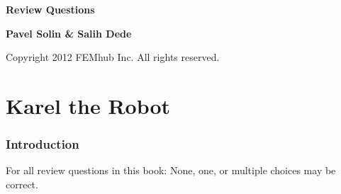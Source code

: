 \documentclass[article,A4,12pt]{llncs}
\newif\iffullversion
\begin{document}
\begin{center}
\vspace{2cm}
{\huge \bf Review Questions}
\end{center}
\vbox{}
\vspace{5mm}
\begin{center}
\iffullversion
\else
\centerline{\huge \color{red}{PREVIEW}}
\fi
\vspace{0.7cm}
{\large
{\bf Pavel Solin \& Salih Dede}
}
\end{center}
\vfill
\vfill
\begin{center}
Copyright 2012 FEMhub Inc. All rights reserved.
\end{center}
\newpage

\section*{}
\small

\normalsize

\newpage
\setcounter{tocdepth}{2}
\tableofcontents

\newpage

\pagestyle{plain}
\setcounter{page}{1}


\part{Karel the Robot}

\section{Introduction}

For all review questions in this book: None, one, or multiple
choices may be correct.
\end{document}

